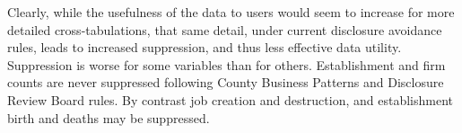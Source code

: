 


Clearly, while the usefulness of the data to users would seem to increase for more detailed 
cross-tabulations, that same detail, under current disclosure avoidance rules, leads to increased 
suppression, and thus less effective data utility. Suppression is worse for some variables than 
for others. Establishment and firm counts are never suppressed following County Business 
Patterns and Disclosure Review Board rules. By contrast job creation and 
destruction, and establishment birth and deaths may be suppressed. 

